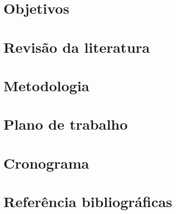 \documentclass[a4paper,12pt]{article}
\begin{document}
\section{Objetivos}
\section{Revisão da literatura}
\section{Metodologia}
\section{Plano de trabalho}
\section{Cronograma}
\section{Referência bibliográficas}
\end{document}
